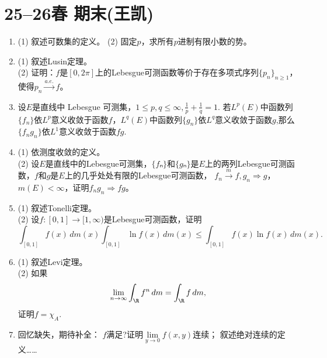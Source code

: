 \section{25--26春 期末(王凯)}
\begin{enumerate}
\item (1) 叙述可数集的定义。
(2) 固定$p$，求所有$p$进制有限小数的势。

\item (1) 叙述Lusin定理。\\
(2) 证明：$f$是$[0,2\pi]$上的Lebesgue可测函数等价于存在多项式序列$\{p_n\}_{n\geqslant1}$，
使得$p_n\stackrel{a.e.}{\longrightarrow}f$。


\item 设$E$是直线中 Lebesgue 可测集，$1\leqslant p,q\leqslant\infty,\frac{1}{p}+\frac{1}{q}=1$. 
若$L^p(E)$中函数列$\{f_n\}$依$L^p$意义收敛于函数$f$，$L^q(E)$中函数列$\{g_n\}$依$L^q$意义收敛于函数$g$,那么 $\{f_ng_n\}$依$L^1$意义收敛于函数$fg$.

\item (1) 依测度收敛的定义。\\
(2) 设$E$是直线中的Lebesgue可测集，$\{fₙ\}$和$\{gₙ\}$是$E$上的两列Lebesgue可测函数，$f$和$g$是$E$上的几乎处处有限的Lebesgue可测函数，
$f_n\stackrel{m}{\longrightarrow}f, g_n\Longrightarrow g$，$m(E)<\infty$，证明$f_ng_n\Longrightarrow fg$。

\item (1) 叙述Tonelli定理。\\
(2) 设$f:[0,1]\rightarrow[1,\infty)$是Lebesgue可测函数，证明
\[\int_{[0,1]}f(x)\,dm(x)\int_{[0,1]}\ln f(x)\,dm(x)\leqslant\int_{[0,1]}f(x)\ln f(x)\,dm(x).\]

\item (1) 叙述Levi定理。\\
(2) 如果\[\lim_{n\to\infty}\int_{\R} f^n\,dm=\int_{\R} f\,dm,\]证明$f=\chi_A$.

\item 回忆缺失，期待补全：
$f$满足?证明$\lim\limits_{y\to 0}f(x,y)$连续；
叙述绝对连续的定义……
\end{enumerate}

